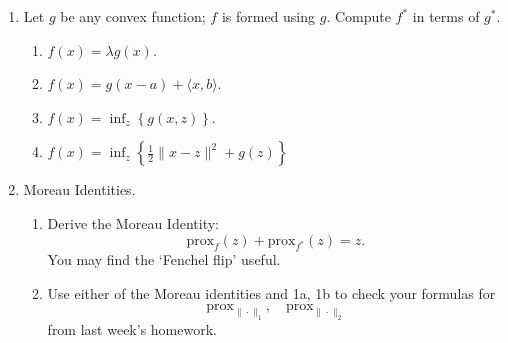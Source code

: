 \documentclass[11pt]{amsart}
\begin{document}
\begin{enumerate}
\item  Let $g$ be any convex function; $f$ is formed using $g$.
Compute $f^*$ in terms of $g^*$.  
\begin{enumerate}
\item $f(x) = \lambda g(x)$.
\item $f(x) = g(x-a) + \langle x, b \rangle$.
\item $f(x) = \inf_z \left\{g(x,z)\right\}$. 
\item $f(x) = \inf_z \left\{\frac{1}{2}\|x-z\|^2 + g(z)\right\}$
\end{enumerate}

\bigskip\bigskip

\item Moreau Identities.
\begin{enumerate}
\item  Derive the Moreau Identity: 
\[
\mbox{prox}_{f}(z) + \mbox{prox}_{f^*}(z) = z. 
\]
You may find the `Fenchel flip' useful. 

\bigskip \bigskip


\bigskip \bigskip

\item Use either of the Moreau identities and 
1a, 1b to check your formulas for 
\[
\mbox{prox}_{\|\cdot\|_1}, \quad \mbox{prox}_{\|\cdot\|_2}
\]
from last week's homework. 
\end{enumerate}





%
%
%
%
%
%
%


\end{enumerate}
\end{document}
